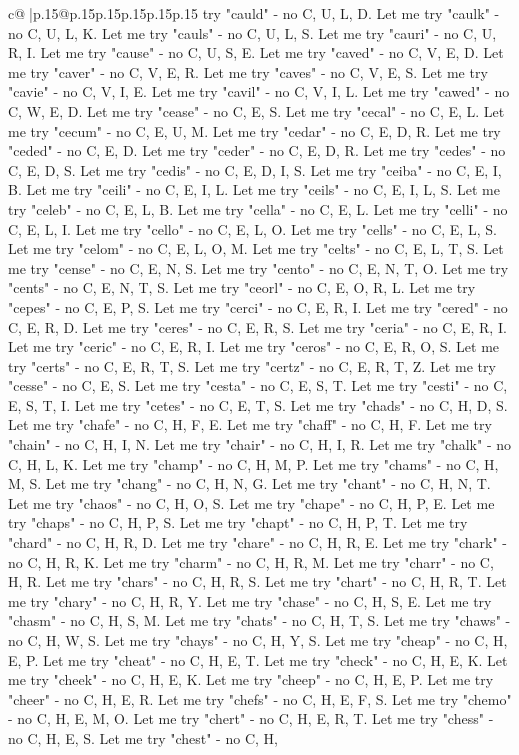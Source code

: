 \documentclass{article}
\begin{document}
{\begin{supertabular}{c@{$\;$}|p{.15\linewidth}@{}p{.15\linewidth}p{.15\linewidth}p{.15\linewidth}p{.15\linewidth}p{.15\linewidth}}
{{{try "cauld" {-} no C, U, L, D. Let me try "caulk" {-} no C, U, L, K. Let me try "cauls" {-} no C, U, L, S. Let me try "cauri" {-} no C, U, R, I. Let me try "cause" {-} no C, U, S, E. Let me try "caved" {-} no C, V, E, D. Let me try "caver" {-} no C, V, E, R. Let me try "caves" {-} no C, V, E, S. Let me try "cavie" {-} no C, V, I, E. Let me try "cavil" {-} no C, V, I, L. Let me try "cawed" {-} no C, W, E, D. Let me try "cease" {-} no C, E, S. Let me try "cecal" {-} no C, E, L. Let me try "cecum" {-} no C, E, U, M. Let me try "cedar" {-} no C, E, D, R. Let me try "ceded" {-} no C, E, D. Let me try "ceder" {-} no C, E, D, R. Let me try "cedes" {-} no C, E, D, S. Let me try "cedis" {-} no C, E, D, I, S. Let me try "ceiba" {-} no C, E, I, B. Let me try "ceili" {-} no C, E, I, L. Let me try "ceils" {-} no C, E, I, L, S. Let me try "celeb" {-} no C, E, L, B. Let me try "cella" {-} no C, E, L. Let me try "celli" {-} no C, E, L, I. Let me try "cello" {-} no C, E, L, O. Let me try "cells" {-} no C, E, L, S. Let me try "celom" {-} no C, E, L, O, M. Let me try "celts" {-} no C, E, L, T, S. Let me try "cense" {-} no C, E, N, S. Let me try "cento" {-} no C, E, N, T, O. Let me try "cents" {-} no C, E, N, T, S. Let me try "ceorl" {-} no C, E, O, R, L. Let me try "cepes" {-} no C, E, P, S. Let me try "cerci" {-} no C, E, R, I. Let me try "cered" {-} no C, E, R, D. Let me try "ceres" {-} no C, E, R, S. Let me try "ceria" {-} no C, E, R, I. Let me try "ceric" {-} no C, E, R, I. Let me try "ceros" {-} no C, E, R, O, S. Let me try "certs" {-} no C, E, R, T, S. Let me try "certz" {-} no C, E, R, T, Z. Let me try "cesse" {-} no C, E, S. Let me try "cesta" {-} no C, E, S, T. Let me try "cesti" {-} no C, E, S, T, I. Let me try "cetes" {-} no C, E, T, S. Let me try "chads" {-} no C, H, D, S. Let me try "chafe" {-} no C, H, F, E. Let me try "chaff" {-} no C, H, F. Let me try "chain" {-} no C, H, I, N. Let me try "chair" {-} no C, H, I, R. Let me try "chalk" {-} no C, H, L, K. Let me try "champ" {-} no C, H, M, P. Let me try "chams" {-} no C, H, M, S. Let me try "chang" {-} no C, H, N, G. Let me try "chant" {-} no C, H, N, T. Let me try "chaos" {-} no C, H, O, S. Let me try "chape" {-} no C, H, P, E. Let me try "chaps" {-} no C, H, P, S. Let me try "chapt" {-} no C, H, P, T. Let me try "chard" {-} no C, H, R, D. Let me try "chare" {-} no C, H, R, E. Let me try "chark" {-} no C, H, R, K. Let me try "charm" {-} no C, H, R, M. Let me try "charr" {-} no C, H, R. Let me try "chars" {-} no C, H, R, S. Let me try "chart" {-} no C, H, R, T. Let me try "chary" {-} no C, H, R, Y. Let me try "chase" {-} no C, H, S, E. Let me try "chasm" {-} no C, H, S, M. Let me try "chats" {-} no C, H, T, S. Let me try "chaws" {-} no C, H, W, S. Let me try "chays" {-} no C, H, Y, S. Let me try "cheap" {-} no C, H, E, P. Let me try "cheat" {-} no C, H, E, T. Let me try "check" {-} no C, H, E, K. Let me try "cheek" {-} no C, H, E, K. Let me try "cheep" {-} no C, H, E, P. Let me try "cheer" {-} no C, H, E, R. Let me try "chefs" {-} no C, H, E, F, S. Let me try "chemo" {-} no C, H, E, M, O. Let me try "chert" {-} no C, H, E, R, T. Let me try "chess" {-} no C, H, E, S. Let me try "chest" {-} no C, H, }}}
\end{supertabular}}
\end{document}
